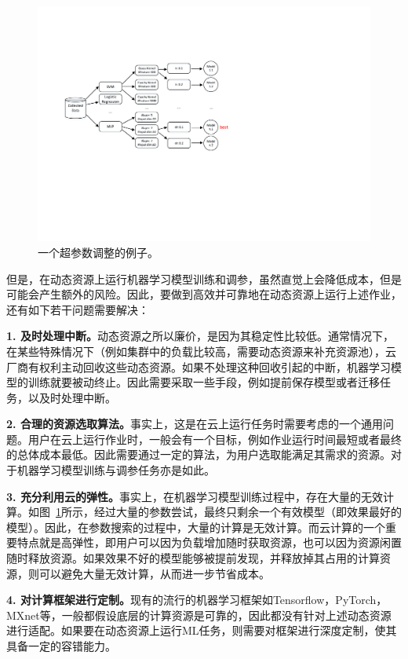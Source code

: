 \begin{figure}[h]
    \centerline{\includegraphics[width=\textwidth]{figures/hpt.pdf}}
    \caption{一个超参数调整的例子。}
    \label{hpt_example}
\end{figure}

但是，在动态资源上运行机器学习模型训练和调参，虽然直觉上会降低成本，但是可能会产生额外的风险。因此，要做到高效并可靠地在动态资源上运行上述作业，还有如下若干问题需要解决：

\textbf{1. 及时处理中断。}动态资源之所以廉价，是因为其稳定性比较低。通常情况下，在某些特殊情况下（例如集群中的负载比较高，需要动态资源来补充资源池），云厂商有权利主动回收这些动态资源。如果不处理这种回收引起的中断，机器学习模型的训练就要被动终止。因此需要采取一些手段，例如提前保存模型或者迁移任务，以及时处理中断。

\textbf{2. 合理的资源选取算法。}事实上，这是在云上运行任务时需要考虑的一个通用问题。用户在云上运行作业时，一般会有一个目标，例如作业运行时间最短或者最终的总体成本最低。因此需要通过一定的算法，为用户选取能满足其需求的资源。对于机器学习模型训练与调参任务亦是如此。

\textbf{3. 充分利用云的弹性。}事实上，在机器学习模型训练过程中，存在大量的无效计算。如图~\ref{hpt_example}所示，经过大量的参数尝试，最终只剩余一个有效模型（即效果最好的模型）。因此，在参数搜索的过程中，大量的计算是无效计算。而云计算的一个重要特点就是高弹性，即用户可以因为负载增加随时获取资源，也可以因为资源闲置随时释放资源。如果效果不好的模型能够被提前发现，并释放掉其占用的计算资源，则可以避免大量无效计算，从而进一步节省成本。

\textbf{4. 对计算框架进行定制。}现有的流行的机器学习框架如Tensorflow\parencite{abadi2016tensorflow}，PyTorch\parencite{paszke2019pytorch}，MXnet\parencite{chen2015mxnet}等，一般都假设底层的计算资源是可靠的，因此都没有针对上述动态资源进行适配。如果要在动态资源上运行ML任务，则需要对框架进行深度定制，使其具备一定的容错能力。

